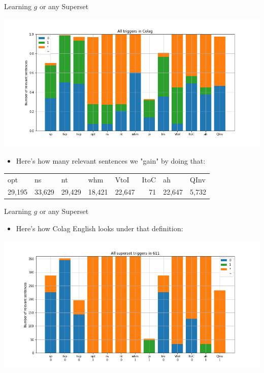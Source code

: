\documentclass[presentation]{beamer}
\begin{document}
\begin{frame}[label={sec:org4192c68}]{Learning \(g\) or any Superset}
\begin{center}
\includegraphics[width=.9\linewidth]{./images/all-triggers-supersets.png}
\end{center}

\begin{itemize}
\item Here's how many relevant sentences we "gain" by doing that:
\end{itemize}

\begin{center}
\begin{tabular}{lllllrll}
opt & ns & nt & whm & VtoI & ItoC & ah & QInv\\
29,195 & 33,629 & 29,429 & 18,421 & 22,647 & 71 & 22,647 & 5,732\\
\end{tabular}
\end{center}
\end{frame}
\begin{frame}[label={sec:org2ade7b4}]{Learning \(g\) or any Superset}
\begin{itemize}
\item Here's how Colag English looks under that definition:
\end{itemize}

\begin{center}
\includegraphics[width=.9\linewidth]{./images/english-triggers-supersets.png}
\end{center}
\end{frame}
\end{document}
